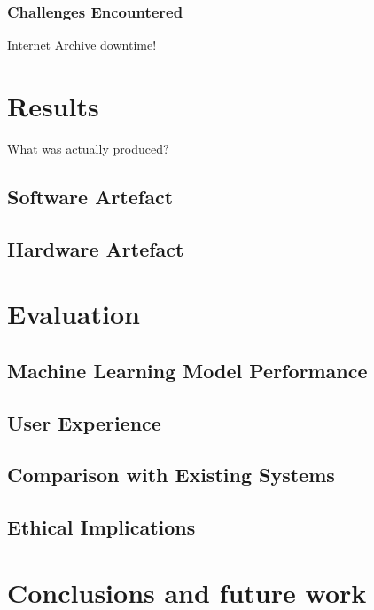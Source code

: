         \subsubsection{Challenges Encountered}
            Internet Archive downtime!


\section{Results} %
    What was actually produced?
    \subsection{Software Artefact}

    \subsection{Hardware Artefact}

\section{Evaluation}
    \subsection{Machine Learning Model Performance}

    \subsection{User Experience}

    \subsection{Comparison with Existing Systems}

    \subsection{Ethical Implications}


\section{Conclusions and future work} %
